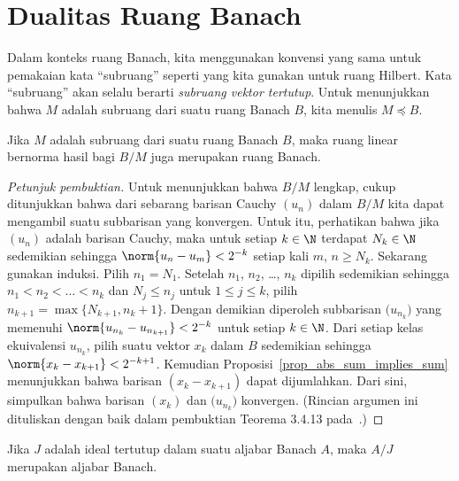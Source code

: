 \section{Dualitas Ruang Banach}

\begin{conv}\label{conv_subsp_Bsp} Dalam konteks ruang Banach, kita menggunakan konvensi yang sama untuk pemakaian kata
``subruang'' seperti yang kita gunakan untuk ruang Hilbert. Kata ``subruang'' akan selalu berarti
\emph{subruang vektor tertutup}. Untuk menunjukkan bahwa $M$ adalah subruang dari suatu ruang Banach $B$, kita menulis
$M \preccurlyeq B$.
\end{conv}

\begin{prop} Jika $M$ adalah subruang dari suatu ruang Banach $B$,
maka ruang linear bernorma hasil bagi $B/M$ juga merupakan ruang Banach.
\end{prop}

\begin{proof}[\emph{Petunjuk pembuktian}] Untuk menunjukkan bahwa $B/M$ lengkap, cukup ditunjukkan bahwa dari
sebarang barisan Cauchy $(u_n)$ dalam $B/M$ kita dapat mengambil suatu subbarisan yang konvergen. Untuk itu,
perhatikan bahwa jika $(u_n)$ adalah barisan Cauchy, maka untuk setiap $k \in \N$ terdapat $N_k \in \N$ sedemikian sehingga
$\norm{u_n - u_m} < 2^{-k}$ setiap kali $m$, $n \ge N_k$. Sekarang gunakan induksi. Pilih $n_1 = N_1$.
Setelah $n_1$, $n_2$, \dots, $n_k$ dipilih sedemikian sehingga $n_1 < n_2 < \dots < n_k$ dan $N_j \le n_j$ untuk
$1 \le j \le k$, pilih $n_{k+1} = \max\{N_{k+1}, n_k + 1\}$. Dengan demikian diperoleh subbarisan
$\bigl(u_{n_k}\bigr)$ yang memenuhi $\norm{u_{n_k} - u_{n_{k+1}}} < 2^{-k}$ untuk setiap $k \in \N$.
Dari setiap kelas ekuivalensi $u_{n_k}$, pilih suatu vektor $x_k$ dalam $B$ sedemikian sehingga $\norm{x_k - x_{k+1}} < 2^{-k+1}$.
Kemudian Proposisi~\ref{prop_abs_sum_implies_sum} menunjukkan bahwa barisan $(x_k - x_{k+1})$ dapat
dijumlahkan. Dari sini, simpulkan bahwa barisan $(x_k)$ dan $\bigl(u_{n_k}\bigr)$ konvergen.
(Rincian argumen ini dituliskan dengan baik dalam pembuktian Teorema 3.4.13 pada~\cite{BrownP:1970}.) \ns
\end{proof}

\begin{prop} Jika $J$ adalah ideal tertutup dalam suatu aljabar Banach $A$,
maka $A/J$ merupakan aljabar Banach.
\end{prop}

